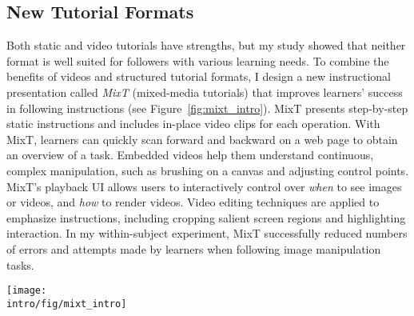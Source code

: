 

\subsection{New Tutorial Formats}

Both static and video tutorials have strengths, but my study showed that neither format is well suited for followers with various learning needs.
%
To combine the benefits of videos and structured tutorial formats, I design a new instructional presentation called \emph{MixT} (mixed-media tutorials) that improves learners' success in following instructions (see Figure~\ref{fig:mixt_intro}).
%
MixT presents step-by-step static instructions and includes in-place video clips for each operation.
%
With MixT, learners can quickly scan forward and backward on a web page to obtain an overview of a task. Embedded videos help them understand continuous, complex manipulation, such as brushing on a canvas and adjusting control points.
%
MixT's playback UI allows users to interactively control over \emph{when} to see images or videos, and \emph{how} to render videos.
%
Video editing techniques are applied to emphasize instructions, including cropping salient screen regions and highlighting interaction.
%
In my within-subject experiment, MixT successfully reduced numbers of errors and attempts made by learners when following image manipulation tasks.

\begin{figure*}[t]
  \centering
  \texttt{[image: \\intro/fig/mixt\_intro]}
  \caption{MixT generates step-by-step tutorials (left) that contain static and video information from task demonstrations. Videos are automatically edited and offer different views (right) to highlight the most relevant screen areas for a step. Visualizing mouse movement helps user understand a complex action.}
  \label{fig:mixt_intro}
\end{figure*}


